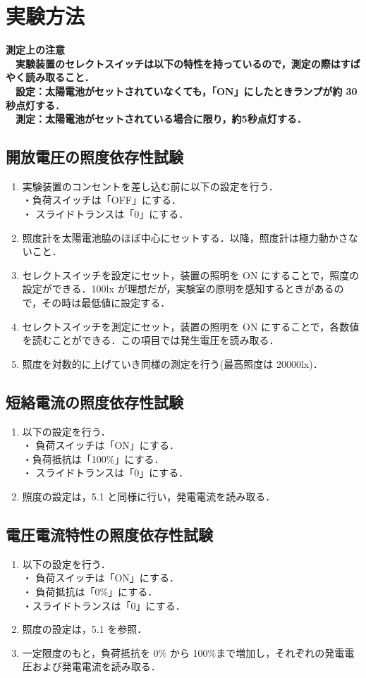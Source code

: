 \section{実験方法}
\bf{測定上の注意}\\
　実験装置のセレクトスイッチは以下の特性を持っているので，測定の際はすばやく読み取ること．\\
　設定：太陽電池がセットされていなくても，「ON」にしたときランプが約 30 秒点灯する． \\
　測定：太陽電池がセットされている場合に限り，約5秒点灯する．\\

\subsection{開放電圧の照度依存性試験}
\begin{enumerate}
  \item 実験装置のコンセントを差し込む前に以下の設定を行う．\\
  ・負荷スイッチは「OFF」にする．\\
  ・ スライドトランスは「0」にする．
  \item 照度計を太陽電池脇のほぼ中心にセットする．以降，照度計は極力動かさないこと．
  \item セレクトスイッチを設定にセット，装置の照明を ON にすることで，照度の設定ができる．100lx が理想だが，実験室の原明を感知するときがあるので，その時は最低値に設定する．
  \item セレクトスイッチを測定にセット，装置の照明を ON にすることで，各数値を読むことができる．この項目では発生電圧を読み取る．
  \item 照度を対数的に上げていき同様の測定を行う(最高照度は 20000lx)．
\end{enumerate}


\subsection{短絡電流の照度依存性試験}
\begin{enumerate}
  \item 以下の設定を行う．\\
  ・ 負荷スイッチは「ON」にする．\\
  ・負荷抵抗は「100\%」にする．\\
  ・ スライドトランスは「0」にする．
  \item 照度の設定は，5.1 と同様に行い，発電電流を読み取る．
\end{enumerate}


\subsection{電圧電流特性の照度依存性試験}
\begin{enumerate}
  \item 以下の設定を行う．\\
  ・ 負荷スイッチは「ON」にする．\\
  ・ 負荷抵抗は「0\%」にする．\\
  ・スライドトランスは「0」にする．
  \item 照度の設定は，5.1 を参照．
  \item 一定限度のもと，負荷抵抗を 0\% から 100\%まで増加し，それぞれの発電電圧および発電電流を読み取る．
\end{enumerate}




